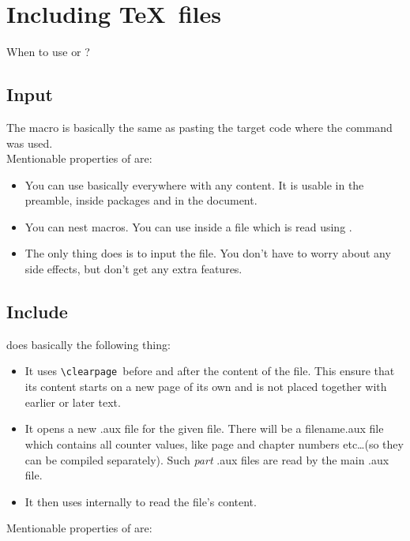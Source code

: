 \documentclass{article}
\begin{document}
\section{Including \TeX \ files}
When to use \verb|| or \verb||?
\vspace{-5pt}
\subsection{Input}
The \verb|| macro is basically the same as pasting the target code where the command was used.\\
Mentionable properties of \verb|| are:
\begin{itemize}
	\item You can use \verb|| basically everywhere with any content.
	It is usable in the preamble, inside packages and in the document.
	\item You can nest \verb|| macros.
	You can use \verb|| inside a file which is read using \verb||.
	\item The only thing \verb|| does is to input the file.
	You don't have to worry about any side effects, but don't get any extra features.
\end{itemize}

\subsection{Include}
\verb|| does basically the following thing:
\begin{itemize}
	\item It uses \verb|\clearpage|\footnotemark \ before and after the content of the file. This ensure that its content starts on a new page of its own and is not placed together with earlier or later text.
	\item It opens a new .aux file for the given file.
	There will be a filename.aux file which contains all counter values, like page and chapter numbers etc\ldots (so they can be compiled separately). Such \textit{part} .aux files are read by the main .aux file.
	\item It then uses \verb|| internally to read the file's content.
\end{itemize}
\vspace{5pt}
Mentionable properties of \verb|| are:
\end{document}

